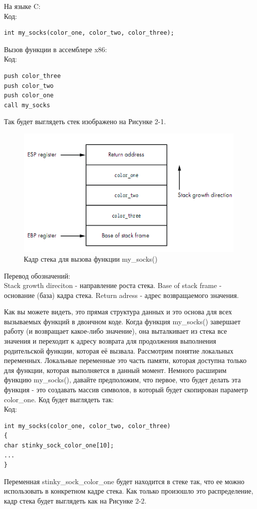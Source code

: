 \documentclass[12pt, a4paper, oneside]{book}
\begin{document}
На языке C:\\
Код:
\begin{verbatim}
int my_socks(color_one, color_two, color_three);
\end{verbatim}
Вызов функции в ассемблере x86:\\
Код:
\begin{verbatim}
push color_three
push color_two
push color_one
call my_socks
\end{verbatim}

Так будет выглядеть стек изображено на Рисунке 2-1.
\begin{figure}
  \center
  \includegraphics{./pic/chap2/1.PNG}
  \caption{Кадр стека для вызова функции my\_socks()}
\end{figure}

Перевод обозначений:\\

    Stack growth direciton - направление роста стека.
    Base of stack frame - основание (база) кадра стека.
    Return adress - адрес возвращаемого значения.


Как вы можете видеть, это прямая структура данных и это основа для всех вызываемых функций в двоичном коде. Когда функция my\_socks() завершает работу (и возвращает какое-либо значение), она выталкивает из стека все значения и переходит к адресу возврата для продолжения выполнения родительской функции, которая её вызвала. Рассмотрим понятие локальных переменных. Локальные переменные это часть памяти, которая доступна только для функции, которая выполняется в данный момент. Немного расширим функцию my\_socks(), давайте предположим, что первое, что будет делать эта функция - это создавать массив символов, в который будет скопирован параметр color\_one. Код будет выглядеть так:\\
Код:
\begin{verbatim}
int my_socks(color_one, color_two, color_three)
{
char stinky_sock_color_one[10];
...
}
\end{verbatim}
Переменная stinky\_sock\_color\_one будет находится в стеке так, что ее можно использовать в конкретном кадре стека. Как только произошло это распределение, кадр стека будет выглядеть как на Рисунке 2-2.\\
\end{document}
